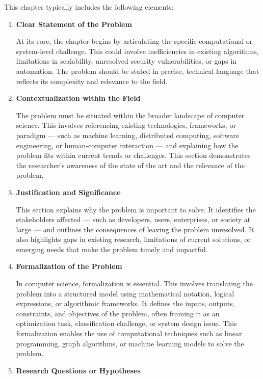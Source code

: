 \documentclass[PCOM,Proposal,Review]{mpThesis}
\newcommand{\Hd}[1]{{\color{SteelBlue}\bf#1}}
\begin{document}
\begin{MainMatter}
\begin{Remark}
This chapter typically includes the following elements:

\begin{enumerate}
\item \Hd{Clear Statement of the Problem}

At its core, the chapter begins by articulating the specific computational or system-level challenge.
This could involve inefficiencies in existing algorithms, limitations in scalability, unresolved security vulnerabilities, or gaps in automation.
The problem should be stated in precise, technical language that reflects its complexity and relevance to the field.

\item \Hd{Contextualization within the Field}

The problem must be situated within the broader landscape of computer science.
This involves referencing existing technologies, frameworks, or paradigm --- such as
machine learning, distributed computing, software engineering, or human-computer interaction --- and
explaining how the problem fits within current trends or challenges.
This section demonstrates the researcher’s awareness of the state of the art and the relevance of the problem.

\item \Hd{Justification and Significance}

This section explains why the problem is important to solve.
It identifies the stakeholders affected --- such as developers, users, enterprises, or society at large --- and
outlines the consequences of leaving the problem unresolved.
It also highlights gaps in existing research, limitations of current solutions, or emerging needs that make the problem timely and impactful.

\item \Hd{Formalization of the Problem}

In computer science, formalization is essential. This involves translating the problem into a structured model using
mathematical notation, logical expressions, or algorithmic frameworks.
It defines the inputs, outputs, constraints, and objectives of the problem, often framing it as an optimization task, classification challenge, or system design issue.
This formalization enables the use of computational techniques such as linear programming, graph algorithms, or machine learning models to solve the problem.

\item \Hd{Research Questions or Hypotheses}


\end{enumerate}
\end{Remark}
\end{MainMatter}
\end{document}
